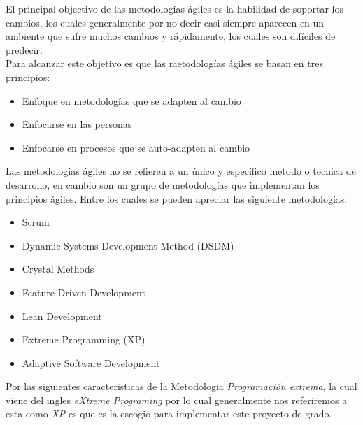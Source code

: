 
    El principal objectivo de las metodologías ágiles es la habilidad de soportar los cambios, los cuales generalmente por no decir casi siempre aparecen en un ambiente que sufre muchos cambios y rápidamente, los cuales son difíciles de predecir.\cite{6}\\


    Para alcanzar este objetivo es que las metodologías ágiles se basan en tres principios\cite{8}:

\begin{itemize}
  \item Enfoque en metodologías que se adapten al cambio
  \item Enfocarse en las personas
  \item Enfocarse en procesos que se auto-adapten al cambio
\end{itemize}

    Las metodologías ágiles no se refieren a un único y específico metodo o tecnica de desarrollo, en cambio son un grupo de metodologías que implementan los principios ágiles. Entre los cuales se pueden apreciar las siguiente metodologías:\\

    \begin{itemize}
      \item Scrum
      \item Dynamic Systems Development Method (DSDM)
      \item Crystal Methods
      \item Feature Driven Development
      \item Lean Development
      \item Extreme Programming (XP)
      \item Adaptive Software Development
    \end{itemize}


    Por las siguientes caracteristicas de la Metodologia \emph{Programaci\'on extrema}, la cual viene del ingles \emph{eXtreme Programing} por lo cual generalmente nos referiremos a esta como \emph{XP} es que es la escogio para implementar este proyecto de grado.


